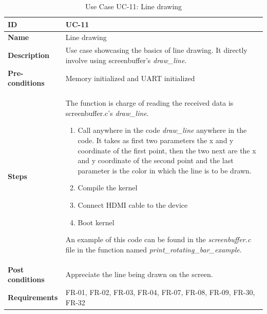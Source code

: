 \begin{table}[H]
    \centering
    \begin{tabular}{| p{3cm} | p{7cm} |}
    \hline
    \textbf{ID}             & UC-11 \\ \hline
    \textbf{Name}           & Line drawing\\ \hline
    \textbf{Description}    & Use case showcasing the basics of line drawing. It directly involve using screenbuffer's \textit{draw\_line}.
	\\ \hline
    \textbf{Pre-conditions} & Memory initialized and UART initialized \\ \hline
    \textbf{Steps}          &  The function is charge of reading the received data is screenbuffer.c's \textit{draw\_line}.
    							 \begin{enumerate}
    							 	\item Call anywhere in the code \textit{draw\_line} anywhere in the code.  It takes as first two parameters the x and y coordinate of the first point, then the two next are the x and y coordinate of the second point and the last parameter is the color in which the line is to be drawn.
    							 	\item Compile the kernel
    							 	\item Connect HDMI cable to the device
    							 	\item Boot kernel
                                \end{enumerate}
                                An example of this code can be found in the \textit{screenbuffer.c} file in the function named \textit{print\_rotating\_bar\_example}.
 \\ \hline
    \textbf{Post conditions} & 	Appreciate the line being drawn on the screen.
    							   	\\ \hline
    \textbf{Requirements}       & FR-01, FR-02, FR-03, FR-04, FR-07, FR-08, FR-09, FR-30, FR-32  \\ \hline
    \end{tabular}
    \caption{Use Case UC-11: Line drawing}
\end{table}



